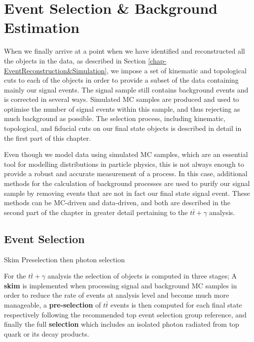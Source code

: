 \chapter{Event Selection \& Background Estimation} \label{chap-EventSelection}

When we finally arrive at a point when we have identified and reconstructed all the objects in the data, as described in Section \ref{chap-EventReconstruction&Simulation}, we impose a set of kinematic and topological cuts to each of the objects in order to provide a subset of the data containing mainly our signal events. The signal sample still contains background events and is corrected in several ways. Simulated MC samples are produced and used to optimise the number of signal events within this sample, and thus rejecting as much background as possible. The selection process, including kinematic, topological, and fiducial cuts on our final state objects is described in detail in the first part of this chapter.

Even though we model data using simulated MC samples, which are an essential tool for modelling distributions in particle physics, this is not always enough to provide a robust and accurate measurement of a process. In this case, additional methods for the calculation of background processes are used to purify our signal sample by removing events that are not in fact our final state signal event. These methods can be MC-driven and data-driven, and both are described in the second part of the chapter in greater detail pertaining to the $t\bar{t}+\gamma$ analysis.  

\section{Event Selection} \label{sec-EventSelection}

Skim
Preselection then photon selection

For the $t\bar{t}+\gamma$ analysis the selection of objects is computed in three stages; A \textbf{skim} is implemented when processing signal and background MC samples in order to reduce the rate of events at analysis level and become much more manageable, a \textbf{pre-selection} of $t\bar{t}$ events is then computed for each final state respectively following the recommended top event selection group reference, and finally the full \textbf{selection} which includes an isolated photon radiated from top quark or its decay products.   

